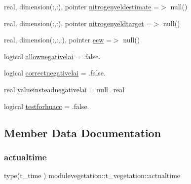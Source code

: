 \begin{DoxyCompactItemize}
\item 
real, dimension(\+:,\+:), pointer \mbox{\hyperlink{structmodulevegetation_1_1t__vegetation_a5ed5a3a7a5d1a02320a6d28deeb5ff99}{nitrogenyeldestimate}} =$>$ null()
\item 
real, dimension(\+:,\+:), pointer \mbox{\hyperlink{structmodulevegetation_1_1t__vegetation_aecddf7049fea0ec0458811bf2a217902}{nitrogenyeldtarget}} =$>$ null()
\item 
real, dimension(\+:,\+:,\+:), pointer \mbox{\hyperlink{structmodulevegetation_1_1t__vegetation_a705afe22731c27b640caa79f2c95669c}{ecw}} =$>$ null()
\item 
logical \mbox{\hyperlink{structmodulevegetation_1_1t__vegetation_a417378a99880c7971475132ec5c090ea}{allownegativelai}} = .false.
\item 
logical \mbox{\hyperlink{structmodulevegetation_1_1t__vegetation_a0291b8f62f41c6ec0c56a292401f9b9e}{correctnegativelai}} = .false.
\item 
real \mbox{\hyperlink{structmodulevegetation_1_1t__vegetation_ab3a5e78f21b4e4a9b3905d24df6ea049}{valueinsteadnegativelai}} = null\+\_\+real
\item 
logical \mbox{\hyperlink{structmodulevegetation_1_1t__vegetation_a5e14a9032b9ff55184948de564806257}{testforhuacc}} = .false.
\end{DoxyCompactItemize}


\subsection{Member Data Documentation}
\mbox{\label{structmodulevegetation_1_1t__vegetation_afd148b5f3caf28d94bfa46f0167885ab}} 
\subsubsection{\texorpdfstring{actualtime}{actualtime}}
{\footnotesize\ttfamily type(t\+\_\+time ) modulevegetation\+::t\+\_\+vegetation\+::actualtime\hspace{0.3cm}{\ttfamily [private]}}

\mbox{\label{structmodulevegetation_1_1t__vegetation_a60bab05abeb20feef5492c4ddb56b786}} 
